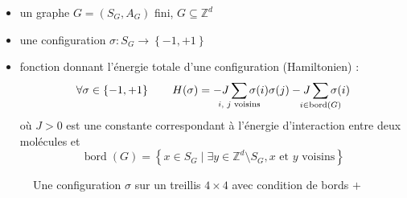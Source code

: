 \documentclass[french]{beamer}
\DeclareMathOperator{\bord}{bord}
\begin{document}
\begin{frame}
    \begin{itemize}
        \item un graphe \(G = \left(S_G, A_G\right) \) fini, \(G \subseteq \mathbb{Z}^d \)
        \item une configuration \(\sigma : S_G \to \left\{-1, +1\right\} \)
        \item fonction donnant l'énergie totale d'une configuration (Hamiltonien) :
        \[
        \forall \sigma \in \left\{-1, +1\right\} \qquad H(\sigma) = - J \sum_{\mathclap{\text{$i$, $j$ voisins}}} \sigma(i)\sigma(j)
                 - J \sum_{\mathclap{i \in \bord(G)}} \sigma(i)
        \]
        où \(J > 0\) est une constante correspondant à l'énergie d'interaction entre deux molécules et
        \[
        \bord(G) = \left\{x \in S_G \mid \exists y \in \mathbb{Z}^d\setminus S_G, \text{$x$ et $y$ voisins} \right\}
        \]
    \end{itemize}
\end{frame}




\begin{frame}
\begin{figure}
    \centering
    \caption{Une configuration $\sigma$ sur un treillis $4\times4$ avec condition de bords $+$}
\end{figure}
\end{frame}
\end{document}
